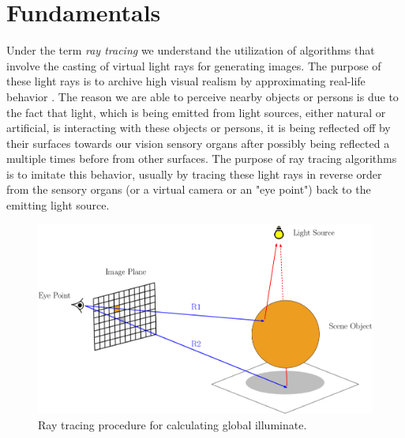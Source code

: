 \chapter{Fundamentals}
\label{chap:fundamentals}

Under the term \emph{ray tracing} we understand the utilization of algorithms that involve the casting of virtual light rays for generating images. The purpose of these light rays is to archive high visual realism by approximating real-life behavior . The reason we are able to perceive nearby objects or persons is due to the fact that light, which is being emitted from light sources, either natural or artificial, is interacting with these objects or persons, it is being reflected off by their surfaces towards our vision sensory organs after possibly being reflected a multiple times before from other surfaces. 
The purpose of ray tracing algorithms is to imitate this behavior, usually by tracing these light rays in reverse order from the sensory organs (or a virtual camera or an "eye point") back to the emitting light source.

\begin{figure}[h]
	\centering
	\includegraphics[width=.9\linewidth]{img/1 fundamentals/ray_tracing.png}
	\caption{Ray tracing procedure for calculating global illuminate.}
	\label{fig:raytracer_general}
\end{figure}

